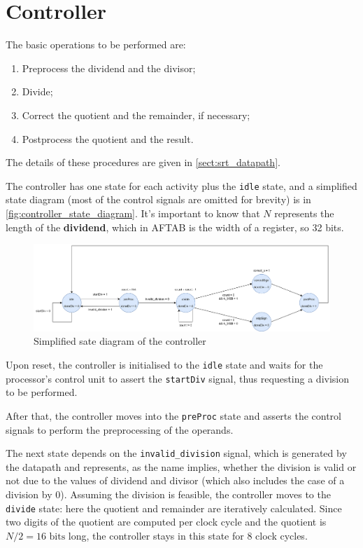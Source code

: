 \section{Controller}\label{sect:srt_controller}
The basic operations to be performed are:
\begin{enumerate}
    \item Preprocess the dividend and the divisor;
    \item Divide;
    \item Correct the quotient and the remainder, if necessary;
    \item Postprocess the quotient and the result.
\end{enumerate}
The details of these procedures are given in \autoref{sect:srt_datapath}. 

The controller has one state for each activity plus the \texttt{idle} state, and a simplified state diagram (most of the control signals are omitted for brevity) is in \autoref{fig:controller_state_diagram}. 
It's important to know that $N$ represents the length of the \textbf{dividend}, which in AFTAB is the width of a register, so 32 bits.
\begin{figure}
    \centering
    \includegraphics[width=150mm]{images/SRTControllerStateDiagramSimplified.png}
    \caption{Simplified sate diagram of the controller}
    \label{fig:controller_state_diagram}
\end{figure}
Upon reset, the controller is initialised to the \texttt{idle} state and waits for the processor's control unit to assert the \texttt{startDiv} signal, thus requesting a division to be performed.

After that, the controller moves into the \texttt{preProc} state and asserts the control signals to perform the preprocessing of the operands.

The next state depends on the \texttt{invalid\_division} signal, which is generated by the datapath and represents, as the name implies, whether the division is valid or not due to the values of dividend and divisor (which also includes the case of a division by 0).
Assuming the division is feasible, the controller moves to the \texttt{divide} state: here the quotient and remainder are iteratively calculated.
Since two digits of the quotient are computed per clock cycle and the quotient is $N / 2 = 16 \text{ bits}$ long, the controller stays in this state for 8 clock cycles.

